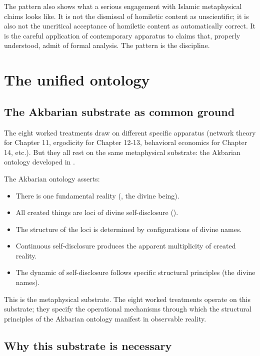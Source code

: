 The pattern also shows what a serious engagement with Islamic
metaphysical claims looks like. It is not the dismissal of
homiletic content as unscientific; it is also not the
uncritical acceptance of homiletic content as automatically
correct. It is the careful application of contemporary apparatus
to claims that, properly understood, admit of formal analysis.
The pattern is the discipline.

\section{The unified ontology}
\label{sec:unified-ontology}

\subsection{The Akbarian substrate as common ground}

The eight worked treatments draw on different specific apparatus
(network theory for Chapter 11, ergodicity for Chapter 12-13,
behavioral economics for Chapter 14, etc.). But they all rest on
the same metaphysical substrate: the Akbarian ontology developed
in .

The Akbarian ontology asserts:

\begin{itemize}[leftmargin=2em]
    \item There is one fundamental reality (, the
    divine being).
    \item All created things are loci of divine self-disclosure
    ().
    \item The structure of the loci is determined by configurations
    of divine names.
    \item Continuous self-disclosure produces the apparent
    multiplicity of created reality.
    \item The dynamic of self-disclosure follows specific structural
    principles (the divine names).
\end{itemize}

This is the metaphysical substrate. The eight worked treatments
operate on this substrate; they specify the operational mechanisms
through which the structural principles of the Akbarian ontology
manifest in observable reality.

\subsection{Why this substrate is necessary}

